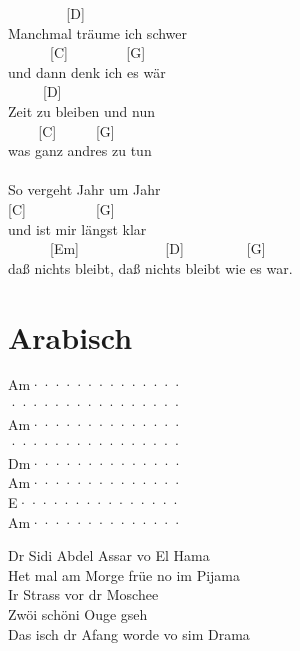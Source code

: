 \documentclass[
  letterpaper,
  twoside=false]{scrbook}
\begin{document}
~ ~ ~ ~ ~ {[}D{]} ~ ~ ~ ~ ~ ~\\
Manchmal träume ich schwer\\
\hspace*{0.333em} ~ ~ ~ ~{[}C{]} ~ ~ ~ ~ ~{[}G{]}\\
und dann denk ich es wär\\
\hspace*{0.333em} ~ ~ ~ {[}D{]} ~ ~ ~ ~ ~ ~\\
Zeit zu bleiben und nun\\
\hspace*{0.333em} ~ ~ ~{[}C{]} ~ ~ ~ {[}G{]}\\
was ganz andres zu tun\\
\hspace*{0.333em} ~ ~ ~ ~ ~ ~ ~ ~ ~ ~ ~\\
So vergeht Jahr um Jahr\\
\hspace*{0.333em} {[}C{]} ~ ~ ~ ~ ~ ~{[}G{]}\\
und ist mir längst klar\\
\hspace*{0.333em} ~ ~ ~ ~{[}Em{]} ~ ~ ~ ~ ~ ~ ~ {[}D{]} ~ ~ ~ ~ ~
{[}G{]}\\
daß nichts bleibt, daß nichts bleibt wie es war.

\hypertarget{arabisch}{%
\chapter{Arabisch}\label{arabisch}}

\textbar Am······\textbar········\textbar{}\\
\textbar········\textbar········\textbar{}\\
\textbar Am······\textbar········\textbar{}\\
\textbar········\textbar········\textbar{}\\
\textbar Dm······\textbar········\textbar{}\\
\textbar Am······\textbar········\textbar{}\\
\textbar E·······\textbar········\textbar{}\\
\textbar Am······\textbar········\textbar{}

Dr Sidi Abdel Assar vo El Hama\\
Het mal am Morge früe no im Pijama\\
Ir Strass vor dr Moschee\\
Zwöi schöni Ouge gseh\\
Das isch dr Afang worde vo sim Drama
\end{document}
